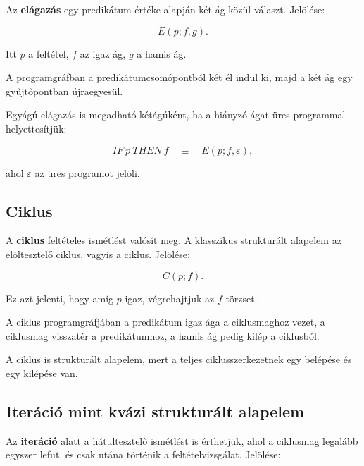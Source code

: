 Az \textbf{elágazás} egy predikátum értéke alapján két ág közül választ. Jelölése:

\[
E(p;f,g).
\]

Itt $p$ a feltétel, $f$ az igaz ág, $g$ a hamis ág.


A programgráfban a predikátumcsomópontból két él indul ki, majd a két ág egy gyűjtőpontban újraegyesül.



Egyágú elágazás is megadható kétágúként, ha a hiányzó ágat üres programmal helyettesítjük:

\[
IF\ p\ THEN\ f \quad \equiv \quad E(p;f,\varepsilon),
\]

ahol $\varepsilon$ az üres programot jelöli.

\subsection{Ciklus}

A \textbf{ciklus} feltételes ismétlést valósít meg. A klasszikus strukturált alapelem az elöltesztelő ciklus, vagyis a  ciklus. Jelölése:

\[
C(p;f).
\]

Ez azt jelenti, hogy amíg $p$ igaz, végrehajtjuk az $f$ törzset.


A ciklus programgráfjában a predikátum igaz ága a ciklusmaghoz vezet, a ciklusmag visszatér a predikátumhoz, a hamis ág pedig kilép a ciklusból.



A ciklus is strukturált alapelem, mert a teljes ciklusszerkezetnek egy belépése és egy kilépése van.

\subsection{Iteráció mint kvázi strukturált alapelem}

Az \textbf{iteráció} alatt a hátultesztelő ismétlést is érthetjük, ahol a ciklusmag legalább egyszer lefut, és csak utána történik a feltételvizsgálat. Jelölése:

